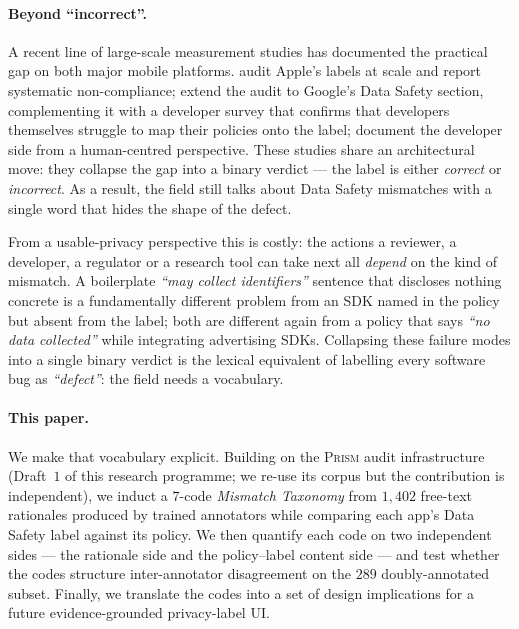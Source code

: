 \documentclass[11pt,a4paper]{article}
\newcommand{\prism}{\textsc{Prism}}
\begin{document}
\paragraph{Beyond ``incorrect''.}
A recent line of large-scale measurement studies has documented the
practical gap on both major mobile platforms. \citet{xiao2023lalaine}
audit Apple's labels at scale and report systematic non-compliance;
\citet{khandelwal2024unpacking} extend the audit to Google's Data
Safety section, complementing it with a developer survey that
confirms that developers themselves struggle to map their policies
onto the label; \citet{li2022understanding} document the developer
side from a human-centred perspective. These studies share an
architectural move: they collapse the gap into a binary verdict ---
the label is either \emph{correct} or \emph{incorrect}. As a result,
the field still talks about Data Safety mismatches with a single
word that hides the shape of the defect.

From a usable-privacy perspective this is costly: the actions a
reviewer, a developer, a regulator or a research tool can take next
all \emph{depend} on the kind of mismatch. A boilerplate
\emph{``may collect identifiers''} sentence that discloses nothing
concrete is a fundamentally different problem from an SDK named in
the policy but absent from the label; both are different again from
a policy that says \emph{``no data collected''} while integrating
advertising SDKs. Collapsing these failure modes into a single binary
verdict is the lexical equivalent of labelling every software bug as
\emph{``defect''}: the field needs a vocabulary.

\paragraph{This paper.}
We make that vocabulary explicit. Building on the \prism{} audit
infrastructure (Draft~$1$ of this research programme; we re-use its
corpus but the contribution is independent), we induct a $7$-code
\emph{Mismatch Taxonomy} from $1{,}402$ free-text rationales produced
by trained annotators while comparing each app's Data Safety label
against its policy. We then quantify each code on two independent
sides --- the rationale side and the policy--label content side --- and
test whether the codes structure inter-annotator disagreement on the
$289$ doubly-annotated subset. Finally, we translate the codes into a
set of design implications for a future evidence-grounded privacy-label
UI.
\end{document}
